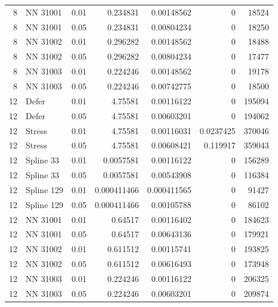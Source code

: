 \begin{longtable}{rlrrrrr}
8 & NN 31001 & 0.01 & 0.234831 & 0.00148562 & 0 & 18524 \\
8 & NN 31001 & 0.05 & 0.234831 & 0.00804234 & 0 & 18250 \\
8 & NN 31002 & 0.01 & 0.296282 & 0.00148562 & 0 & 18488 \\
8 & NN 31002 & 0.05 & 0.296282 & 0.00804234 & 0 & 17477 \\
8 & NN 31003 & 0.01 & 0.224246 & 0.00148562 & 0 & 19178 \\
8 & NN 31003 & 0.05 & 0.224246 & 0.00742775 & 0 & 18500 \\
12 & Defer & 0.01 & 4.75581 & 0.00116122 & 0 & 195094 \\
12 & Defer & 0.05 & 4.75581 & 0.00603201 & 0 & 194062 \\
12 & Stress & 0.01 & 4.75581 & 0.00116031 & 0.0237425 & 370046 \\
12 & Stress & 0.05 & 4.75581 & 0.00608421 & 0.119917 & 359043 \\
12 & Spline 33 & 0.01 & 0.0057581 & 0.00116122 & 0 & 156289 \\
12 & Spline 33 & 0.05 & 0.0057581 & 0.00543908 & 0 & 116384 \\
12 & Spline 129 & 0.01 & 0.000411466 & 0.000411565 & 0 & 91427 \\
12 & Spline 129 & 0.05 & 0.000411466 & 0.00105788 & 0 & 86102 \\
12 & NN 31001 & 0.01 & 0.64517 & 0.00116402 & 0 & 184623 \\
12 & NN 31001 & 0.05 & 0.64517 & 0.00643136 & 0 & 179921 \\
12 & NN 31002 & 0.01 & 0.611512 & 0.00115741 & 0 & 193825 \\
12 & NN 31002 & 0.05 & 0.611512 & 0.00616493 & 0 & 173948 \\
12 & NN 31003 & 0.01 & 0.224246 & 0.00116122 & 0 & 206325 \\
12 & NN 31003 & 0.05 & 0.224246 & 0.00603201 & 0 & 209874 \\
\bottomrule\end{longtable}
